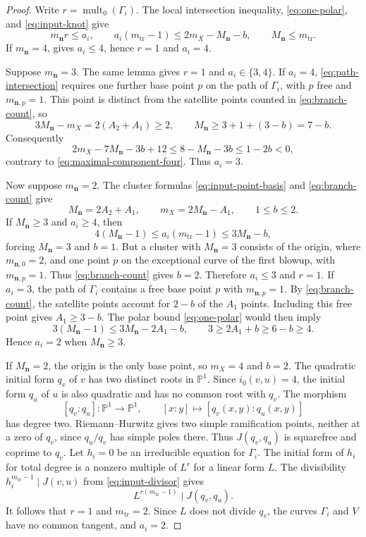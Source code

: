\documentclass[11pt,letterpaper]{article}
\numberwithin{equation}{section}
\theoremstyle{remark}
\theoremstyle{plain}
\newcommand{\mult}{\operatorname{mult}}
\begin{document}
\begin{proof}
Write $r=\mult_0(\Gamma_i)$.  The local intersection inequality,
\eqref{eq:one-polar}, and \eqref{eq:input-knot} give
\[
 m_{\boldsymbol n}r\leq a_i,\qquad
 a_i(m_{\mathrm{tr}}-1)\leq2m_X-M_{\boldsymbol n}-b,\qquad
 M_{\boldsymbol n}\leq m_{\mathrm{tr}}.
\]
If $m_{\boldsymbol n}=4$, 
gives $a_i\leq4$, hence $r=1$ and $a_i=4$.

Suppose $m_{\boldsymbol n}=3$.  The same lemma gives
$r=1$ and $a_i\in\{3,4\}$.  If $a_i=4$,
\eqref{eq:path-intersection} requires one further base point $p$ on
the path of $\Gamma_i$, with $p$ free and $m_{\boldsymbol n,p}=1$.  This point is distinct from
the satellite points counted in \eqref{eq:branch-count}, so
\[
 3M_{\boldsymbol n}-m_X=2(A_2+A_1)\geq2,\qquad
 M_{\boldsymbol n}\geq3+1+(3-b)=7-b.
\]
Consequently
\[
 2m_X-7M_{\boldsymbol n}-3b+12
 \leq8-M_{\boldsymbol n}-3b\leq1-2b<0,
\]
contrary to \eqref{eq:maximal-component-four}.  Thus $a_i=3$.

Now suppose $m_{\boldsymbol n}=2$.  The cluster formulas
\eqref{eq:input-point-basis} and \eqref{eq:branch-count} give
\[
 M_{\boldsymbol n}=2A_2+A_1,\qquad
 m_X=2M_{\boldsymbol n}-A_1,\qquad 1\leq b\leq2.
\]
If $M_{\boldsymbol n}\geq3$ and $a_i\geq4$, then
\[
 4(M_{\boldsymbol n}-1)
 \leq a_i(m_{\mathrm{tr}}-1)
 \leq3M_{\boldsymbol n}-b,
\]
forcing $M_{\boldsymbol n}=3$ and $b=1$.  But a cluster with
$M_{\boldsymbol n}=3$ consists of the origin, where
$m_{\boldsymbol n,0}=2$, and one point $p$ on the exceptional curve
of the first blowup, with
$m_{\boldsymbol n,p}=1$.  Thus \eqref{eq:branch-count} gives $b=2$.
Therefore $a_i\leq3$ and $r=1$.
If $a_i=3$, the path of $\Gamma_i$ contains a free base point $p$
with $m_{\boldsymbol n,p}=1$.  By \eqref{eq:branch-count}, the satellite
points account for $2-b$ of the $A_1$ points.  Including this free
point gives $A_1\geq3-b$.  The polar bound \eqref{eq:one-polar} would then imply
\[
 3(M_{\boldsymbol n}-1)
 \leq3M_{\boldsymbol n}-2A_1-b,\qquad
 3\geq2A_1+b\geq6-b\geq4.
\]
Hence $a_i=2$ when $M_{\boldsymbol n}\geq3$.

If $M_{\boldsymbol n}=2$, the origin is the only base point, so
$m_X=4$ and $b=2$.  The quadratic initial form $q_v$ of $v$ has two
distinct roots in $\mathbb P^1$.  Since $i_0(v,u)=4$, the initial form
$q_u$ of $u$ is also quadratic and has no common root with $q_v$.
The morphism
\[
 [q_v:q_u]:\mathbb P^1\longrightarrow\mathbb P^1,\qquad
 [x:y]\longmapsto[q_v(x,y):q_u(x,y)]
\]
has degree two.  Riemann--Hurwitz gives two simple ramification
points, neither at a zero of $q_v$, since $q_u/q_v$ has simple
poles there.  Thus $J(q_v,q_u)$ is squarefree and coprime to $q_v$.
Let $h_i=0$ be an irreducible equation for $\Gamma_i$.  The initial
form of $h_i$ for total degree is a nonzero multiple
of $L^r$ for a linear form $L$.  The divisibility
$h_i^{m_{\mathrm{tr}}-1}\mid J(v,u)$ from \eqref{eq:input-divisor} gives
\[
 L^{r(m_{\mathrm{tr}}-1)}\mid J(q_v,q_u).
\]
It follows that $r=1$ and $m_{\mathrm{tr}}=2$.  Since $L$ does not
divide $q_v$, the curves $\Gamma_i$ and $V$ have no common tangent,
and $a_i=2$.


\end{proof}
\end{document}
